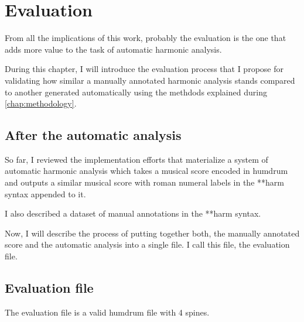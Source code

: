 \chapter{Evaluation}
\label{chap:evaluation}
From all the implications of this work, probably the evaluation is the one that adds more value to the task of automatic harmonic analysis.


During this chapter, I will introduce the evaluation process that I propose for validating how similar a manually annotated harmonic analysis stands compared to another generated automatically using the methdods explained during \autoref{chap:methodology}.

\section{After the automatic analysis}
So far, I reviewed the implementation efforts that materialize a system of automatic harmonic analysis which takes a musical score encoded in humdrum and outputs a similar musical score with roman numeral labels in the **harm syntax appended to it.

I also described a dataset of manual annotations in the **harm syntax.

Now, I will describe the process of putting together both, the manually annotated score and the automatic analysis into a single file. I call this file, the evaluation file.

\section{Evaluation file}
	The evaluation file is a valid humdrum file with 4 spines.

